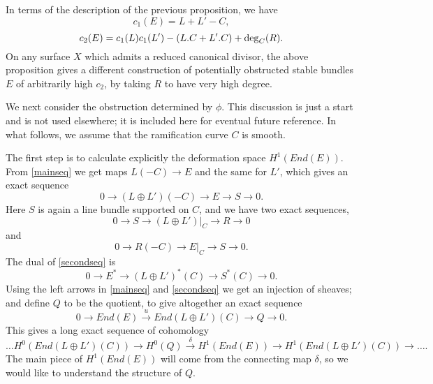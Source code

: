 \documentclass{amsart}
\theoremstyle{plain}
\numberwithin{equation}{section}
\begin{document}
In terms of the description of the previous proposition, we have 
$$
c_1(E) = L + L' - C,
$$
$$
c_2(E) = c_1(L)c_1(L') - (L.C + L'.C) +{\rm deg}_C(R) . 
$$
On any surface $X$ which admits a reduced canonical divisor, 
the above proposition gives a different construction of 
potentially obstructed stable bundles $E$ of arbitrarily high $c_2$,
by taking $R$ to have very high degree. 

We next consider the obstruction determined by $\phi$. 
This discussion is just a start and is not used elsewhere; it is included
here for eventual future reference. In what follows, we assume that the
ramification curve $C$ is smooth. 

The first step is to calculate explicitly the deformation space $H^1(End (E))$.
From \eqref{mainseq} we get maps $L(-C)\rightarrow E$ and the same for $L'$,
which gives an exact sequence
\begin{equation}
\label{secondseq}
0\rightarrow (L\oplus L')(-C)\rightarrow E\rightarrow S\rightarrow 0.
\end{equation}
Here $S$ is again a line bundle supported on $C$, and we have two exact sequences,
\begin{equation}
\label{CseqL}
0\rightarrow S\rightarrow (L\oplus L')|_C \rightarrow R\rightarrow 0
\end{equation}
and
\begin{equation}
\label{CseqE}
0\rightarrow R(-C)\rightarrow E|_C\rightarrow S\rightarrow 0.
\end{equation}
The dual of \eqref{secondseq} is
\begin{equation}
\label{dualseq}
0\rightarrow E^{\ast}\rightarrow (L\oplus L')^{\ast}(C)\rightarrow S^{\ast}(C)\rightarrow 0.
\end{equation}
Using the left arrows in \eqref{mainseq} and \eqref{secondseq} we get an injection 
of sheaves; and define $Q$ to be the quotient, to give altogether an exact sequence
\begin{equation}
\label{endseq}
0\rightarrow End(E) \stackrel{u}{\rightarrow}
End(L\oplus L')(C) \rightarrow Q \rightarrow 0.
\end{equation}
This gives a long exact sequence of cohomology
\begin{equation}
\label{leseq}
\ldots 
H^0 (End(L\oplus L')(C) )\rightarrow 
H^0(Q)\stackrel{\delta}{\rightarrow} H^1(End(E) )\rightarrow 
H^1 (End(L\oplus L')(C))\rightarrow \ldots .
\end{equation}
The main piece of $H^1(End(E) )$ will come from the
connecting map $\delta$, so we would like to understand the structure of $Q$. 
\end{document}
